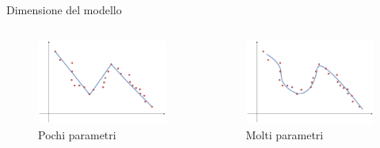 \documentclass{beamer}
\begin{document}
\begin{frame}{Dimensione del modello}
  \begin{columns}
    \begin{column}{0.48\textwidth}
        \begin{figure}
            \centering
            \includegraphics[width=1.0\linewidth]{imgs/emergent/chartnn.badbad.png}
            \caption*{Pochi parametri}
        \end{figure}
    \end{column}
    
    \begin{column}{0.48\textwidth}
        \begin{figure}
            \centering
            \includegraphics[width=1.0\linewidth]{imgs/emergent/chartnngoodgrosso(1).png}
            \caption*{Molti parametri}
        \end{figure}
    \end{column}
  \end{columns}
\end{frame}
\end{document}
